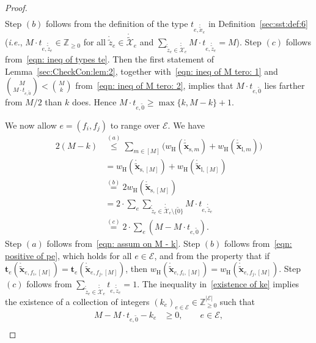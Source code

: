 \documentclass[journal]{IEEEtran}
\newcommand{\vect}[1]{ \bm{#1} }
\newcommand{\setEfull}{ \mathcal{E} }
\newcommand{\vt}{ \vect{t} }
\newcommand{\wh}{w_{\mathrm{H}}}
\newcommand{\sZp}{ \mathbb{Z}_{\geq 0} }
\newcommand{\LCTtset}[1]{\mathring{\tilde{\mathcal{#1}}}}
\newcommand{\LCTtv}[1]{ \mathring{ \tilde{ \vect{#1} } } }
\newcommand{\LCTt}[1]{ \mathring{ \tilde{#1} } }
\newcommand{\efi}{ e,f_i }
\newcommand{\efj}{ e,f_j }
\newcommand{\LCTvxlm}{ \LCTtv{x}_{\mathrm{l},m} }
\newcommand{\LCTvxsm}{ \LCTtv{x}_{\mathrm{s},m} }
\newcommand{\LCTvxlM}{ \LCTtv{x}_{\mathrm{l},[M]} }
\newcommand{\LCTvxsM}{ \LCTtv{x}_{\mathrm{s},[M]} }
\newcommand{\tzero}{\tilde{0}}
\newcommand*{\ie}{\textit{i.e.}}
\begin{document}
\begin{appendices}
\begin{proof}
{\begin{align}
    \end{align}
    Step $(b)$ follows from the definition of the type
    $ t_{e,\LCTt{x}_{e}} $ in Definition~\ref{sec:sst:def:6} (\ie,
    $ M \cdot t_{e,\LCTt{z}_{e}} \in \sZp $ for all $ \LCTt{z}_{e} \in \LCTtset{X}_{e} $
    and $ \sum_{\LCTt{z}_{e} \in \LCTtset{X}_{e} } M \cdot t_{e,\LCTt{z}_{e}} = M $).
    Step $(c)$ follows from~\eqref{eqn: ineq of types te}.
    Then the first statement of Lemma~\ref{sec:CheckCon:lem:2}, together with~\eqref{eqn: ineq of M tero: 1} and $\binom{M}{M \cdot t_{e,\tzero}} < \binom{M}{k}$ from~\eqref{eqn: ineq of M tero: 2}, implies that $M \cdot t_{e,\tzero}$ lies farther from $M/2$ than $k$ does. Hence $M \cdot t_{e,\tzero} \geq \max\{k, M-k\} + 1 $.}%

    We now allow $ e = (f_{i},f_{j}) $ to range over $\setEfull$.
    We have
    \begin{align}
      2(M-k)
       & \overset{(a)}{\leq}
      \sum_{m \in [M]} \bigl( \wh(\LCTvxsm) + \wh( \LCTvxlm) \bigr)
      \nonumber                            \\
       & = \wh(\LCTvxsM) + \wh(\LCTvxlM)
      \nonumber                            \\
       & \overset{(b)}{=}
      2 \wh(\LCTvxsM)
      \nonumber                            \\
       & =
      2 \cdot \sum_{e}
      \sum_{ \LCTt{z}_{e} \in \LCTtset{X}_{e} \setminus \{\tzero\} }
      M \cdot t_{ e, \LCTt{z}_{e} }
      \nonumber                            \\
       & \overset{(c)}{=} 2 \cdot \sum_{e}
      ( M - M \cdot t_{ e, \tzero } ).
      \label{existence of ke}
    \end{align}
    Step $(a)$ follows from~\eqref{eqn: assum on M - k}.
    Step $(b)$ follows from~\eqref{eqn: positive of pe}, which holds for all $ e \in \setEfull $,
    and from the property that
    if $ \vt_e(\LCTtv{x}_{\efi,[M]}) = \vt_e(\LCTtv{x}_{\efj,[M]}) $,
    then $ \wh(\LCTtv{x}_{\efi,[M]}) = \wh(\LCTtv{x}_{\efj,[M]}) $.
    Step $(c)$ follows from $ \sum_{ \LCTt{z}_{e} \in \LCTtset{X}_{e} } t_{ e, \LCTt{z}_{e} } = 1 $.
    The inequality in~\eqref{existence of ke} implies the existence of a collection of integers
    $ (k_{e})_{e \in \setEfull} \in \sZp^{|\setEfull|} $ such that
    \begin{align}
      M - M \cdot t_{e,\tzero} - k_{e}     & \geq 0, \qquad e \in \setEfull,
      \nonumber                                                              \\

\end{align}
\end{proof}
\end{appendices}
\end{document}
